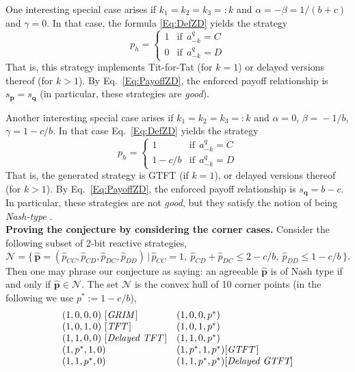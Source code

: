 \documentclass{article}
\theoremstyle{definition}
\begin{document}
One interesting special case arises if $k_1\!=\!k_2\!=\!k_3\!=:\!k$ and $\alpha = -\beta =1/(b\!+\!c)$ and $\gamma=0$.
In that case, the formula \eqref{Eq:DefZD} yields the strategy
\begin{equation}
p_h = \left\{
\begin{array}{ll}
1	&\text{if}~~a^q_{-k}=C\\
0	&\text{if}~~a^q_{-k}=D
\end{array}
\right.
\end{equation}
That is, this strategy implements Tit-for-Tat (for $k\!=\!1$) or delayed versions thereof (for $k\!>\!1$). By Eq.~\eqref{Eq:PayoffZD}, the enforced payoff relationship is $s_\mathbf{p}\!=\! s_\mathbf{q}$ (in particular, these strategies are {\it good}). 

Another interesting special case arises if  $k_1\!=\!k_2\!=\!k_3\!=:\!k$ and $\alpha\!=\!0$, $\beta\!=\!-1/b$, $\gamma\!=\!1\!-\!c/b$. In that case Eq.~\eqref{Eq:DefZD} yields the strategy
\begin{equation}
p_h = \left\{
\begin{array}{ll}
1	&\text{if}~~a^q_{-k}=C\\
1-c/b	&\text{if}~~a^q_{-k}=D
\end{array}
\right.
\end{equation}
That is, the generated strategy is GTFT (if $k\!=\!1$), or delayed versions thereof (for $k\!>\!1$). By Eq.~\eqref{Eq:PayoffZD}, the enforced payoff relationship is $s_\mathbf{q}\!=\!b\!-\!c$. In particular, these strategies are not {\it good}, but they satisfy the notion of being {\it Nash-type} \citep{akin:EGADS:2016}.\\

\noindent
{\bf Proving the conjecture by considering the corner cases.} Consider the following subset of 2-bit reactive strategies,
\begin{equation}
\mathcal{N} = \Big\{ \, \mathbf{\hat{p}}\!=\!(\hat{p}_{CC}, \hat{p}_{CD}, \hat{p}_{DC}, \hat{p}_{DD}) \, \Big| \, \hat{p}_{CC}\!=\!1, ~\hat{p}_{CD}\!+\!\hat{p}_{DC} \le 2-c/b, ~ \hat{p}_{DD} \le 1\!-\!c/b \, \Big\}. 
\end{equation}
Then one may phrase our conjecture as saying: an agreeable $\mathbf{\hat{p}}$ is of Nash type if and only if $\mathbf{\hat{p}}\!\in\!\mathcal{N}$. The set $\mathcal{N}$ is the convex hull of 10 corner points (in the following we use $p^*:=1-c/b$), 
\begin{equation}
\begin{array}{ll}
(1,0,0,0)~[\emph{GRIM}\,]	&(1,0,0,p^*)\\
(1,0,1,0)~[\emph{TFT}\,]		&(1,0,1,p^*)\\
(1,1,0,0)~[\emph{Delayed~TFT}\,]	&(1,1,0,p^*)\\
(1,p^*,1,0)			&(1,p^*,1,p^*) [\emph{GTFT}\,]\\
(1,1,p^*,0)		&(1,1,p^*,p^*) [\emph{Delayed~GTFT}]
\end{array}
\end{equation}
\end{document}
